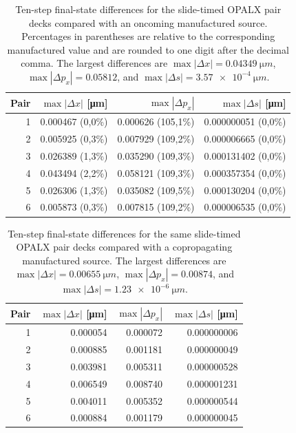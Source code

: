 \documentclass[11pt]{article}
\begin{document}
\begin{table}[htbp]
  \centering
  \begin{tabular}{rrrr}
    \hline
    Pair & \(\max|\Delta x|\) [\si{\micro m}]
    & \(\max|\Delta p_x|\)
    & \(\max|\Delta s|\) [\si{\micro m}] \\
    \hline
    1 & 0.000467 (0,0\%) & 0.000626 (105,1\%) & 0.000000051 (0,0\%) \\
    2 & 0.005925 (0,3\%) & 0.007929 (109,2\%) & 0.000006665 (0,0\%) \\
    3 & 0.026389 (1,3\%) & 0.035290 (109,3\%) & 0.000131402 (0,0\%) \\
    4 & 0.043494 (2,2\%) & 0.058121 (109,3\%) & 0.000357354 (0,0\%) \\
    5 & 0.026306 (1,3\%) & 0.035082 (109,5\%) & 0.000130204 (0,0\%) \\
    6 & 0.005873 (0,3\%) & 0.007815 (109,2\%) & 0.000006535 (0,0\%) \\
    \hline
  \end{tabular}
  \caption{Ten-step final-state differences for the slide-timed OPALX pair
  decks compared with an oncoming manufactured source.  Percentages in
  parentheses are relative to the corresponding manufactured value and are
  rounded to one digit after the decimal comma.  The largest differences
  are \(\max|\Delta x|=\SI{0.04349}{\micro m}\),
  \(\max|\Delta p_x|=0.05812\), and
  \(\max|\Delta s|=\SI{3.57e-4}{\micro m}\).}
  \label{tab:slide-timed-final-oncoming}
\end{table}

\begin{table}[htbp]
  \centering
  \begin{tabular}{rrrr}
    \hline
    Pair & \(\max|\Delta x|\) [\si{\micro m}]
    & \(\max|\Delta p_x|\)
    & \(\max|\Delta s|\) [\si{\micro m}] \\
    \hline
    1 & 0.000054 & 0.000072 & 0.000000006 \\
    2 & 0.000885 & 0.001181 & 0.000000049 \\
    3 & 0.003981 & 0.005311 & 0.000000528 \\
    4 & 0.006549 & 0.008740 & 0.000001231 \\
    5 & 0.004011 & 0.005352 & 0.000000544 \\
    6 & 0.000884 & 0.001179 & 0.000000045 \\
    \hline
  \end{tabular}
  \caption{Ten-step final-state differences for the same slide-timed OPALX
  pair decks compared with a copropagating manufactured source.  The largest
  differences are \(\max|\Delta x|=\SI{0.00655}{\micro m}\),
  \(\max|\Delta p_x|=0.00874\), and
  \(\max|\Delta s|=\SI{1.23e-6}{\micro m}\).}
  \label{tab:slide-timed-final-copropagating}
\end{table}
\end{document}
